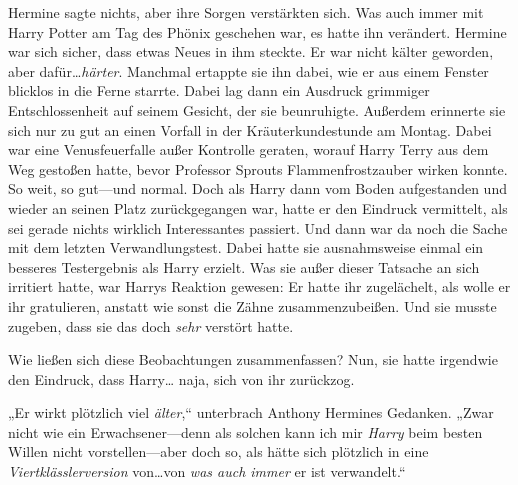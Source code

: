 Hermine sagte nichts, aber ihre Sorgen verstärkten sich.
Was auch immer mit Harry Potter am Tag des Phönix geschehen war, es hatte ihn verändert. Hermine war sich sicher, dass etwas Neues in ihm steckte. Er war nicht kälter geworden, aber dafür…\emph{härter}. Manchmal ertappte sie ihn dabei, wie er aus einem Fenster blicklos in die Ferne starrte. Dabei lag dann ein Ausdruck grimmiger Entschlossenheit auf seinem Gesicht, der sie beunruhigte. Außerdem erinnerte sie sich nur zu gut an einen Vorfall in der Kräuterkundestunde am Montag. Dabei war eine Venusfeuerfalle außer Kontrolle geraten, worauf Harry Terry aus dem Weg gestoßen hatte, bevor Professor Sprouts Flammenfrostzauber wirken konnte. So weit, so gut—und normal. Doch als Harry dann vom Boden aufgestanden und wieder an seinen Platz zurückgegangen war, hatte er den Eindruck vermittelt, als sei gerade nichts wirklich Interessantes passiert.
Und dann war da noch die Sache mit dem letzten Verwandlungstest. Dabei hatte sie ausnahmsweise einmal ein besseres Testergebnis als Harry erzielt. Was sie außer dieser Tatsache an sich irritiert hatte, war Harrys Reaktion gewesen: Er hatte ihr zugelächelt, als wolle er ihr gratulieren, anstatt wie sonst die Zähne zusammenzubeißen. Und sie musste zugeben, dass sie das doch \emph{sehr} verstört hatte.

%
Wie ließen sich diese Beobachtungen zusammenfassen? Nun, sie hatte irgendwie den Eindruck, dass Harry… naja, sich von ihr zurückzog.

„Er wirkt plötzlich viel \emph{älter},“ unterbrach Anthony Hermines Gedanken. „Zwar nicht wie ein Erwachsener—denn als solchen kann ich mir \emph{Harry} beim besten Willen nicht vorstellen—aber doch so, als hätte sich plötzlich in eine \emph{Viertklässlerversion} von…von \emph{was auch immer} er ist verwandelt.“

